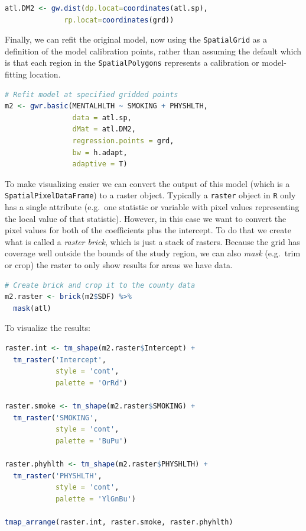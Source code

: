 \documentclass[
]{book}
\newcommand{\passthrough}[1]{#1}
\begin{document}
\begin{lstlisting}[language=R]
atl.DM2 <- gw.dist(dp.locat=coordinates(atl.sp),
              rp.locat=coordinates(grd))
\end{lstlisting}

Finally, we can refit the original model, now using the \passthrough{\lstinline!SpatialGrid!} as a definition of the model calibration points, rather than assuming the default which is that each region in the \passthrough{\lstinline!SpatialPolygons!} represents a calibration or model-fitting location.

\begin{lstlisting}[language=R]
# Refit model at specified gridded points
m2 <- gwr.basic(MENTALHLTH ~ SMOKING + PHYSHLTH, 
                data = atl.sp,
                dMat = atl.DM2, 
                regression.points = grd,
                bw = h.adapt,
                adaptive = T)
\end{lstlisting}

To make visualizing easier we can convert the output of this model (which is a \passthrough{\lstinline!SpatialPixelDataFrame!}) to a raster object. Typically a \passthrough{\lstinline!raster!} object in \passthrough{\lstinline!R!} only has a single attribute (e.g.~one statistic or variable with pixel values representing the local value of that statistic). However, in this case we want to convert the pixel values for both of the coefficients plus the intercept. To do that we create what is called a \emph{raster brick}, which is just a stack of rasters. Because the grid has coverage well outside the bounds of the study region, we can also \emph{mask} (e.g.~trim or crop) the raster to only show results for areas we have data.

\begin{lstlisting}[language=R]
# Create brick and crop it to the county data
m2.raster <- brick(m2$SDF) %>%
  mask(atl)
\end{lstlisting}

To visualize the results:

\begin{lstlisting}[language=R]
raster.int <- tm_shape(m2.raster$Intercept) +
  tm_raster('Intercept',
            style = 'cont',
            palette = 'OrRd')

raster.smoke <- tm_shape(m2.raster$SMOKING) +
  tm_raster('SMOKING',
            style = 'cont',
            palette = 'BuPu')

raster.phyhlth <- tm_shape(m2.raster$PHYSHLTH) +
  tm_raster('PHYSHLTH',
            style = 'cont',
            palette = 'YlGnBu')

tmap_arrange(raster.int, raster.smoke, raster.phyhlth)
\end{lstlisting}
\end{document}
